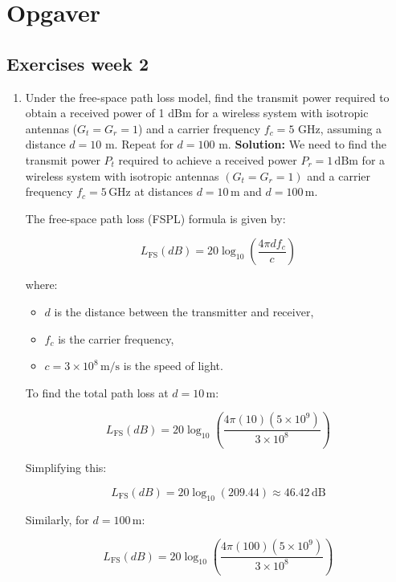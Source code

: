 \documentclass[a4paper,12pt]{book}
\begin{document}
	\chapter{Opgaver}
	\section{Exercises week 2}
	
	\begin{enumerate}
		\item Under the free-space path loss model, find the transmit power required to obtain a received power of 1 dBm for a wireless system with isotropic antennas ($G_t = G_r = 1$) and a carrier frequency $f_c = 5$ GHz, assuming a distance $d = 10$ m. Repeat for $d = 100$ m.
		\newline\newline\noindent
		\textbf{Solution:} We need to find the transmit power \( P_t \) required to achieve a received power \( P_r = 1 \, \text{dBm} \) for a wireless system with isotropic antennas \( (G_t = G_r = 1) \) and a carrier frequency \( f_c = 5 \, \text{GHz} \) at distances \( d = 10 \, \text{m} \) and \( d = 100 \, \text{m} \).
		
		The free-space path loss (FSPL) formula is given by:
		
		\[
		L_{\text{FS}}(dB) = 20 \log_{10}\left( \frac{4\pi d f_c}{c} \right)
		\]
		
		where:
		\begin{itemize}
			\item \( d \) is the distance between the transmitter and receiver,
			\item \( f_c \) is the carrier frequency,
			\item \( c = 3 \times 10^8 \, \text{m/s} \) is the speed of light.
		\end{itemize}
		
		To find the total path loss at \( d = 10 \, \text{m} \):
		
		\[
		L_{\text{FS}}(dB) = 20 \log_{10}\left( \frac{4\pi (10) (5 \times 10^9)}{3 \times 10^8} \right)
		\]
		
		Simplifying this:
		
		\[
		L_{\text{FS}}(dB) = 20 \log_{10}(209.44) \approx 46.42 \, \text{dB}
		\]
		
		Similarly, for \( d = 100 \, \text{m} \):
		
		\[
		L_{\text{FS}}(dB) = 20 \log_{10}\left( \frac{4\pi (100) (5 \times 10^9)}{3 \times 10^8} \right) 
		\]
		

\end{enumerate}
\end{document}
